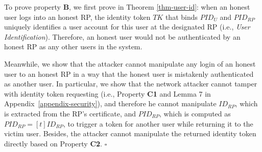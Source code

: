 
To prove property {\bf B}, we first prove in Theorem \ref{thm-user-id}: when an honest user logs into an honest RP, the identity token $TK$ that binds $PID_U$ and $PID_{RP}$ uniquely identifies a user account for this user at the designated RP (i.e., {\em User Identification}). Therefore, an honest user would not be authenticated by an honest RP as any other users in the system.

Meanwhile, we show that the attacker cannot manipulate any login of an honest user to an honest RP in a way that the honest user is mistakenly authenticated as another user. 
In particular, we show that the network attacker cannot tamper with identity token requesting (i.e., Property \textbf{C1} and Lemma 7 in Appendix~\ref{appendix-security}), and therefore he cannot manipulate $ID_{RP}$, which is extracted from the RP's certificate, and $PID_{RP}$, which is computed as $PID_{RP}=[t]ID_{RP}$, to trigger a token for another user while returning it to the victim user. Besides, the attacker cannot manipulate the returned identity token directly based on Property \textbf{C2}. 
\hfill $\square$

